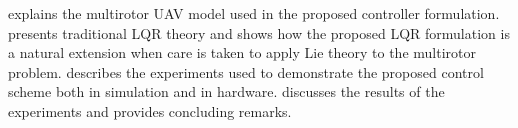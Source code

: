 

 explains the multirotor UAV model used in the proposed
controller formulation.  presents traditional LQR
theory and shows how the proposed LQR formulation is a natural extension when
care is taken to apply Lie theory to the multirotor problem.
 describes the experiments used to demonstrate the
proposed control scheme both in simulation and in hardware.
 discusses the results of the experiments and
 provides concluding remarks.
